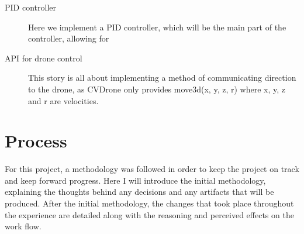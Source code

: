 \begin{description}
	\item[PID controller] Here we implement a PID controller, which will be the main part of the controller, allowing for 
	\item[API for drone control] This story is all about implementing a method of communicating direction to the drone, as CVDrone only provides move3d(x, y, z, r) where x, y, z and r are velocities. 
\end{description}



\clearpage
\section{Process}

For this project, a methodology was followed in order to keep the project on track and keep forward progress. Here I will introduce the initial methodology, explaining the thoughts behind any decisions and any artifacts that will be produced. After the initial methodology, the changes that took place throughout the experience are detailed along with the reasoning and perceived effects on the work flow.


